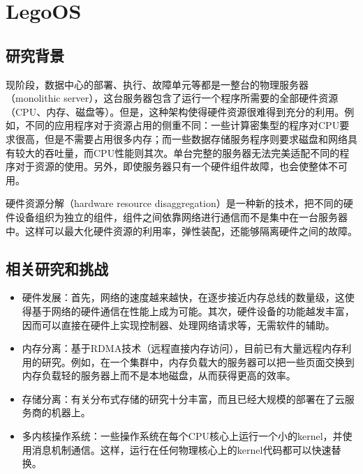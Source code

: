 
\chapter{LegoOS} %

\label{ChapterX} %


\section{研究背景}

现阶段，数据中心的部署、执行、故障单元等都是一整台的物理服务器（monolithic server），这台服务器包含了运行一个程序所需要的全部硬件资源（CPU、内存、磁盘等）。但是，这种架构使得硬件资源很难得到充分的利用。例如，不同的应用程序对于资源占用的侧重不同：一些计算密集型的程序对CPU要求很高，但是不需要占用很多内存；而一些数据存储服务程序则要求磁盘和网络具有较大的吞吐量，而CPU性能则其次。单台完整的服务器无法完美适配不同的程序对于资源的使用。另外，即使服务器只有一个硬件组件故障，也会使整体不可用。

硬件资源分解（hardware resource disaggregation）是一种新的技术，把不同的硬件设备组织为独立的组件，组件之间依靠网络进行通信而不是集中在一台服务器中。这样可以最大化硬件资源的利用率，弹性装配，还能够隔离硬件之间的故障。


\section{相关研究和挑战}
\begin{itemize}
\item 硬件发展：首先，网络的速度越来越快，在逐步接近内存总线的数量级，这使得基于网络的硬件通信在性能上成为可能。其次，硬件设备的功能越发丰富，因而可以直接在硬件上实现控制器、处理网络请求等，无需软件的辅助。
\item 内存分离：基于RDMA技术（远程直接内存访问），目前已有大量远程内存利用的研究。例如，在一个集群中，内存负载大的服务器可以把一些页面交换到内存负载轻的服务器上而不是本地磁盘，从而获得更高的效率。\parencite{gu2017efficient}
\item 存储分离：有关分布式存储的研究十分丰富，而且已经大规模的部署在了云服务商的机器上。
\item 多内核操作系统：一些操作系统在每个CPU核心上运行一个小的kernel，并使用消息机制通信。这样，运行在任何物理核心上的kernel代码都可以快速替换。\parencite{zellweger2014decoupling}
\end{itemize}

